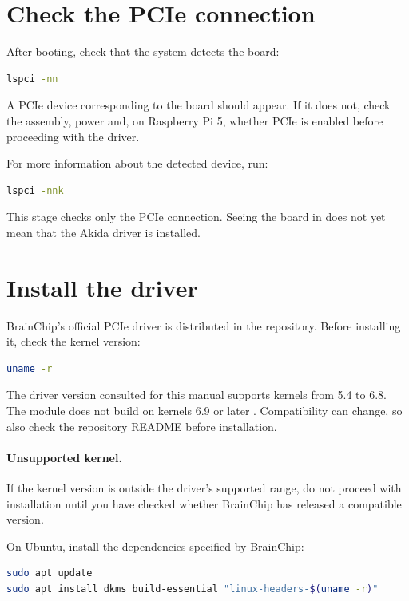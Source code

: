 \section{Check the PCIe connection}

After booting, check that the system detects the board:

\begin{lstlisting}[language=bash]
lspci -nn
\end{lstlisting}

A PCIe device corresponding to the board should appear. If it does not, check the
assembly, power and, on Raspberry Pi 5, whether PCIe is enabled before proceeding
with the driver.

For more information about the detected device, run:

\begin{lstlisting}[language=bash]
lspci -nnk
\end{lstlisting}

This stage checks only the PCIe connection. Seeing the board in  does
not yet mean that the Akida driver is installed.

\section{Install the driver}

BrainChip's official PCIe driver is distributed in the 
repository. Before installing it, check the kernel version:

\begin{lstlisting}[language=bash]
uname -r
\end{lstlisting}

The driver version consulted for this manual supports kernels from 5.4 to 6.8.
The module does not build on kernels 6.9 or later \cite{brainchip_driver}.
Compatibility can change, so also check the repository README before installation.

\paragraph{Unsupported kernel.}
If the kernel version is outside the driver's supported range, do not proceed with
installation until you have checked whether BrainChip has released a compatible version.


On Ubuntu, install the dependencies specified by BrainChip:

\begin{lstlisting}[language=bash]
sudo apt update
sudo apt install dkms build-essential "linux-headers-$(uname -r)"
\end{lstlisting}

